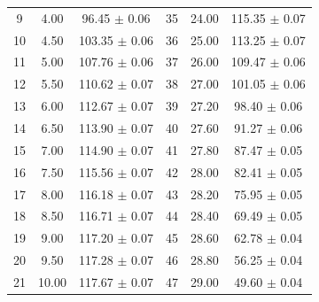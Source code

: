 \documentclass[a4paper]{article}
\begin{document}
\begin{table}[htbp]
\begin{tabular}{ccc||ccc}
		9  & 4.00                 & 96.45 $\pm$ 0.06                                     & 35 & 24.00                & 115.35 $\pm$ 0.07                                    \\
		10 & 4.50                 & 103.35 $\pm$ 0.06                                    & 36 & 25.00                & 113.25 $\pm$ 0.07                                    \\
		11 & 5.00                 & 107.76 $\pm$ 0.06                                    & 37 & 26.00                & 109.47 $\pm$ 0.06                                    \\
		12 & 5.50                 & 110.62 $\pm$ 0.07                                    & 38 & 27.00                & 101.05 $\pm$ 0.06                                    \\
		13 & 6.00                 & 112.67 $\pm$ 0.07                                    & 39 & 27.20                & 98.40 $\pm$ 0.06                                     \\
		14 & 6.50                 & 113.90 $\pm$ 0.07                                    & 40 & 27.60                & 91.27 $\pm$ 0.06                                     \\
		15 & 7.00                 & 114.90 $\pm$ 0.07                                    & 41 & 27.80                & 87.47 $\pm$ 0.05                                     \\
		16 & 7.50                 & 115.56 $\pm$ 0.07                                    & 42 & 28.00                & 82.41 $\pm$ 0.05                                     \\
		17 & 8.00                 & 116.18 $\pm$ 0.07                                    & 43 & 28.20                & 75.95 $\pm$ 0.05                                     \\
		18 & 8.50                 & 116.71 $\pm$ 0.07                                    & 44 & 28.40                & 69.49 $\pm$ 0.05                                     \\
		19 & 9.00                 & 117.20 $\pm$ 0.07                                    & 45 & 28.60                & 62.78 $\pm$ 0.04                                     \\
		20 & 9.50                 & 117.28 $\pm$ 0.07                                    & 46 & 28.80                & 56.25 $\pm$ 0.04                                     \\
		21 & 10.00                & 117.67 $\pm$ 0.07                                    & 47 & 29.00                & 49.60 $\pm$ 0.04                                     \\

\end{tabular}
\end{table}
\end{document}
